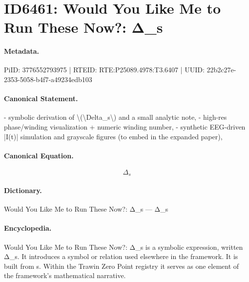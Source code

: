 \section*{ID6461: Would You Like Me to Run These Now?: Δ\_s}
\paragraph{Metadata.}
PiID: 3776552793975 | RTEID: RTE:P25089.4978:T3.6407 | UUID: 22b2c27e-2353-5058-b4f7-a49234edb103

\paragraph{Canonical Statement.}
- symbolic derivation of \textbackslash{}(\textbackslash{}Delta\_s\textbackslash{}) and a small analytic note, - high-res phase/winding visualization + numeric winding number, - synthetic EEG-driven |I(t)| simulation and grayscale figures (to embed in the expanded paper),

\paragraph{Canonical Equation.}
\[
\Delta_s
\]

\paragraph{Dictionary.}
Would You Like Me to Run These Now?: Δ\_s — Δ\_s

\paragraph{Encyclopedia.}
Would You Like Me to Run These Now?: Δ\_s is a symbolic expression, written Δ\_s. It introduces a symbol or relation used elsewhere in the framework. It is built from s. Within the Trawin Zero Point registry it serves as one element of the framework's mathematical narrative.

